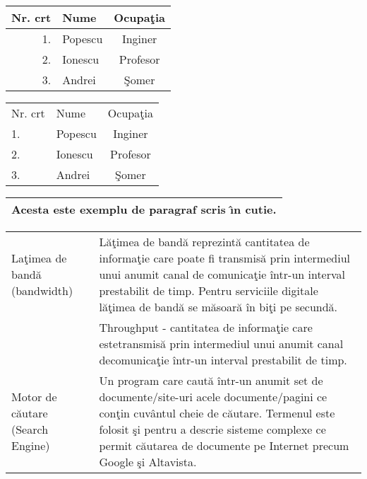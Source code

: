 \documentclass{article}
\begin{document}

\begin{tabular}{| r | l | c | }
	\hline \hline
	Nr. crt & Nume & Ocupaţia \\
	\hline \hline
	1. & Popescu & Inginer \\
	\hline
	2. & Ionescu & Profesor \\
	\hline
	3. & Andrei & Şomer \\
	\hline
\end{tabular}

\vspace{.5cm}

\begin{tabular}{| l l c |}
	\hline
	Nr. crt & Nume & Ocupaţia \\
	1. & Popescu & Inginer \\
	2. & Ionescu & Profesor \\
	3. & Andrei & Şomer \\
	\hline
\end{tabular}

\vspace{.5cm}

\begin{tabular}{|p{4cm}|}
	\hline
	Acesta este exemplu de paragraf scris \^\i n cutie. \\
	\hline
\end{tabular}

\vspace{.5cm}

\begin{tabular}{|p{}|p{}|}
	\hline
	La\c timea de band\u a (bandwidth)&
	L\u a\c timea de band\u a reprezint\u a cantitatea de informa\c tie care poate fi transmis\u a prin intermediul unui anumit canal de comunica\c tie \^intr-un interval prestabilit de timp. Pentru serviciile digitale l\u a\c timea de band\u a se m\u asoar\u a \^in bi\c ti pe secund\u a.\\
	&Throughput - cantitatea de informa\c tie care estetransmis\u a prin intermediul unui anumit canal decomunica\c tie \^intr-un interval prestabilit de timp. \\\hline
	Motor de c\u autare (Search Engine) & Un program care caut\u a \^intr-un anumit set de documente/site-uri acele documente/pagini ce con\c tin cuv\^antul cheie de c\u autare. Termenul este folosit şi pentru a descrie sisteme complexe ce permit căutarea de documente pe Internet precum Google şi Altavista.\\ \hline
\end{tabular}
\end{document}
